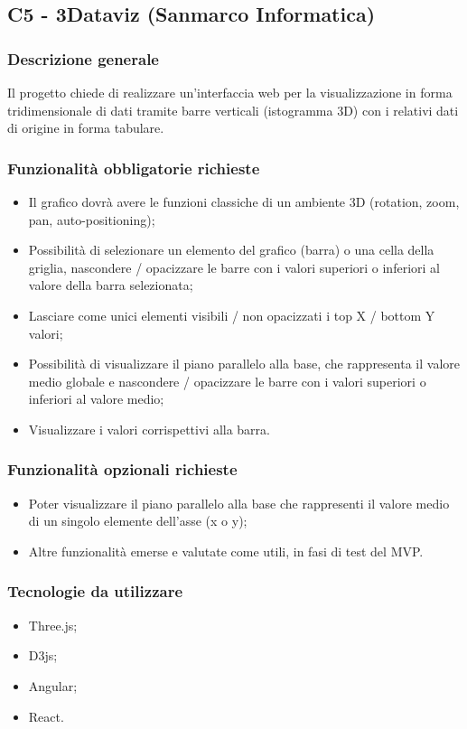 \documentclass[10pt]{article}
\begin{document}
\subsection{C5 - 3Dataviz (Sanmarco Informatica)}
\subsubsection{Descrizione generale}
Il progetto chiede di realizzare un'interfaccia web per la visualizzazione in forma
tridimensionale di dati tramite barre verticali (istogramma 3D) con i relativi dati di origine in forma tabulare.
\subsubsection{Funzionalità obbligatorie richieste}
\begin{itemize}
    \item Il grafico dovrà avere le funzioni classiche di un ambiente 3D (rotation, zoom, pan, auto-positioning);
    \item Possibilità di selezionare un elemento del grafico (barra) o una cella della griglia, nascondere / opacizzare le barre con i valori superiori o inferiori al valore della barra selezionata;
    \item Lasciare come unici elementi visibili / non opacizzati i top X / bottom Y valori;
    \item Possibilità di visualizzare il piano parallelo alla base, che rappresenta il valore medio globale e nascondere / opacizzare le barre con i valori superiori o inferiori al valore medio;
    \item Visualizzare i valori corrispettivi alla barra.
\end{itemize}
\subsubsection{Funzionalità opzionali richieste}
\begin{itemize}
    \item Poter visualizzare il piano parallelo alla base che rappresenti il valore medio di un singolo elemente dell’asse (x o y);
    \item Altre funzionalità emerse e valutate come utili, in fasi di test del MVP.
\end{itemize}
\subsubsection{Tecnologie da utilizzare}
\begin{itemize}
    \item Three.js;
    \item D3js;
    \item Angular;
    \item React.
\end{itemize}
\end{document}
